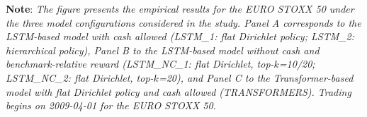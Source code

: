 \documentclass[]{elsarticle}
\begin{document}
\vspace{-0.4cm}


\linespread{0.61}\selectfont
{\noindent\scriptsize \textbf{Note}: \textit{The figure presents the empirical results for the EURO STOXX 50 under the three model configurations considered in the study. Panel A corresponds to the LSTM-based model with cash allowed (LSTM\_1: flat Dirichlet policy; LSTM\_2: hierarchical policy), Panel B to the LSTM-based model without cash and benchmark-relative reward (LSTM\_NC\_1: flat Dirichlet, top-$k$=10/20; LSTM\_NC\_2: flat Dirichlet, top-$k$=20), and Panel C to the Transformer-based model with flat Dirichlet policy and cash allowed (TRANSFORMERS). Trading begins on 2009-04-01 for the EURO STOXX 50.}}


\linespread{1.5}\selectfont

\newpage
\end{document}

